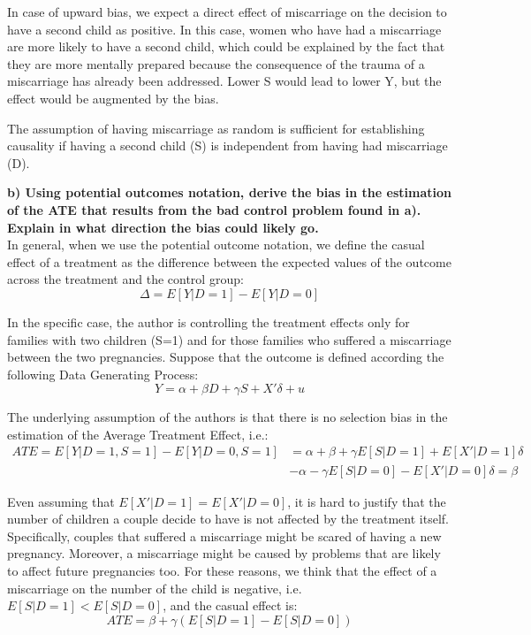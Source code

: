 \documentclass[a4paper,12pt,oneside,English]{article}
\begin{document}
In case of upward bias, we expect a direct effect of miscarriage on the decision to have a second child as positive. In this case, women who have had a miscarriage are more likely to have a second child, which could be explained by the fact that they are more mentally prepared because the consequence of the trauma of a miscarriage has already been addressed. Lower S would lead to lower Y, but the effect would be augmented by the bias.

The assumption of having miscarriage as random is sufficient for establishing causality if having a second child (S) is independent from having had miscarriage (D).

\textbf{b) Using potential outcomes notation, derive the bias in the estimation of the ATE that results from the bad control problem found in a). Explain in what direction the bias could likely go.}\\

In general, when we use the potential outcome notation, we define the casual effect of a treatment as the difference between the expected values of the outcome across the treatment and the control group:
\begin{equation}
    \Delta=E[Y|D=1]-E[Y|D=0]
\end{equation}

In the specific case, the author is controlling the treatment effects only for families with two children (S=1) and for those families who suffered a miscarriage between the two pregnancies. Suppose that the outcome is defined according the following Data Generating Process:
\begin{equation}
    Y=\alpha+\beta D + \gamma S + X'\delta + u
\end{equation}

The underlying assumption of the authors is that there is no selection bias in the estimation of the Average Treatment Effect, i.e.:
\begin{equation}
\begin{split}
    ATE=E[Y|D=1, S=1]-E[Y|D=0, S=1]&=\alpha + \beta +\gamma E[S|D=1] + E[X'|D=1]\delta\\&- \alpha -  \gamma E[S|D=0] - E[X'|D=0]\delta=\beta
\end{split}
\end{equation}

Even assuming that $E[X'|D=1]=E[X'|D=0]$, it is hard to justify that the number of children a couple decide to have is not affected by the treatment itself. Specifically, couples that suffered a miscarriage might be scared of having a new pregnancy. Moreover, a miscarriage might be caused by problems that are likely to affect future pregnancies too. For these reasons, we think that the effect of a miscarriage on the number of the child is negative, i.e. $E[S|D=1]<E[S|D=0]$, and the casual effect is:
\begin{equation}
    ATE=\beta+\gamma(E[S|D=1]-E[S|D=0])
\end{equation}
\end{document}
